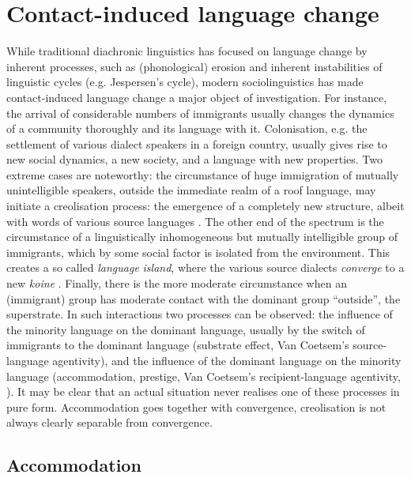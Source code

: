 \documentclass[output=paper,hidelinks,draftmode]{langscibook}
\begin{document}
\section{Contact-induced language change}\label{sec:postma:2}


While traditional diachronic linguistics has focused on language change by inherent processes, such as (phonological) erosion and inherent instabilities of linguistic cycles (e.g. Jespersen's cycle), modern sociolinguistics has made contact-induced language change a major object of investigation. For instance, the arrival of considerable numbers of immigrants usually changes the dynamics of a community thoroughly and its language with it. Colonisation, e.g. the settlement of various dialect speakers in a foreign country, usually gives rise to new social dynamics, a new society, and a language with new properties. Two extreme cases are noteworthy: the circumstance of huge immigration of mutually unintelligible speakers, outside the immediate realm of a roof language, may initiate a creolisation process: the emergence of a completely new structure, albeit with words of various source languages \citep{bickerton2015roots}. The other end of the spectrum is the circumstance of a linguistically inhomogeneous but mutually intelligible group of immigrants, which by some social factor is isolated from the environment. This creates a so called \textit{language} \textit{island}, where the various source dialects \textit{converge} to a new \textit{koine} \citep{Frings1936, Rosenberg2005}. Finally, there is the more moderate circumstance when an (immigrant) group has moderate contact with the dominant group ``outside'', the superstrate. In such interactions two processes can be observed: the influence of the minority language on the dominant language, usually by the switch of immigrants to the dominant language (substrate effect, Van Coetsem's source-language agentivity), and the influence of the dominant language on the minority language (accommodation, prestige, Van Coetsem's recipient-language agentivity, \citealt{Coetsem1988}). It may be clear that an actual situation never realises one of these processes in pure form. Accommodation goes together with convergence, creolisation is not always clearly separable from convergence.

\subsection{Accommodation}
\end{document}
